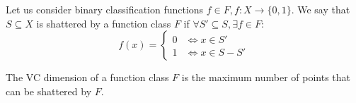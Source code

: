 \begin{definition}
Let us consider binary classification functions $f \in F, f: X \rightarrow \{0,
1\}$. We say that $S \subseteq X$ is shattered by a function class $F$ if
$\forall S' \subseteq S, \exists f \in F$:
\begin{equation}
	f(x) = \begin{cases}
	0 & \iff x \in S' \\
	1 & \iff x \in S - S'
	\end{cases}
\end{equation}
\end{definition}

\begin{definition}[VC dimension]
The VC dimension of a function class $F$ is the maximum number of points that
can be shattered by $F$.
\end{definition}
